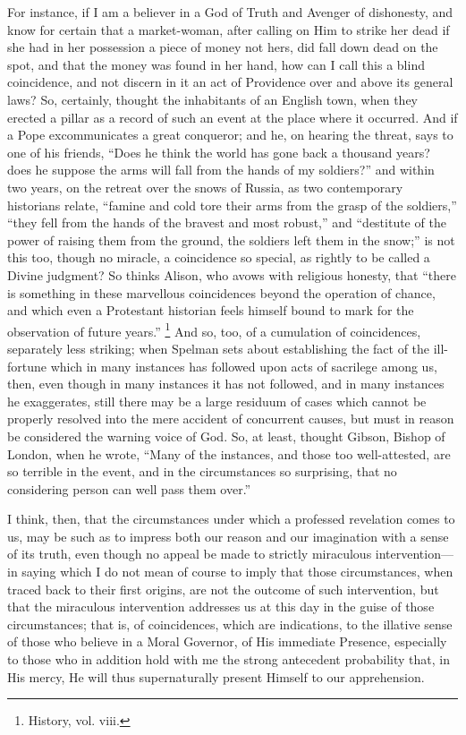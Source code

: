 For instance, if I am a believer in a God of Truth and Avenger of
dishonesty, and know for certain that a market-woman, after
calling on Him to strike her dead if she had in her possession a piece
of money not hers, did fall down dead on the spot, and that the money
was found in her hand, how can I call this a blind coincidence, and
not discern in it an act of Providence over and above its general
laws? So, certainly, thought the inhabitants of an English town, when
they erected a pillar as a record of such an event at the place where
it occurred. And if a Pope excommunicates a great conqueror; and he,
on hearing the threat, says to one of his friends, ``Does he think
the world has gone back a thousand years? does he suppose the arms
will fall from the hands of my soldiers?'' and within two years,
on the retreat over the snows of Russia, as two contemporary
historians relate, ``famine and cold tore their arms from the
grasp of the soldiers,'' ``they fell from the hands of the
bravest and most robust,'' and ``destitute of the power of
raising them from the ground, the soldiers left them in the
snow;'' is not this too, though no miracle, a coincidence so
special, as rightly to be called a Divine judgment? So thinks Alison,
who avows with religious honesty, that ``there is something in
these marvellous coincidences beyond the operation of chance, and
which even a Protestant historian feels himself bound to mark for the
observation of future years.'' \footnote{History, vol.
viii.} And so, too, of a cumulation of coincidences, separately less
striking; when Spelman sets about establishing the fact of the
ill-fortune which in many instances has followed upon acts of
sacrilege among us, then, even though in many instances it has not
followed, and in many instances he exaggerates, still there may
be a large residuum of cases which cannot be properly resolved into
the mere accident of concurrent causes, but must in reason be
considered the warning voice of God. So, at least, thought Gibson,
Bishop of London, when he wrote, ``Many of the instances, and
those too well-attested, are so terrible in the event, and in the
circumstances so surprising, that no considering person can well pass
them over.''

I think, then, that the circumstances under which a professed
revelation comes to us, may be such as to impress both our reason and
our imagination with a sense of its truth, even though no appeal be
made to strictly miraculous intervention—in saying which I do not
mean of course to imply that those circumstances, when traced back to
their first origins, are not the outcome of such intervention, but
that the miraculous intervention addresses us at this day in the guise
of those circumstances; that is, of coincidences, which are
indications, to the illative sense of those who believe in a Moral
Governor, of His immediate Presence, especially to those who in
addition hold with me the strong antecedent probability that, in His
mercy, He will thus supernaturally present Himself to our
apprehension.


